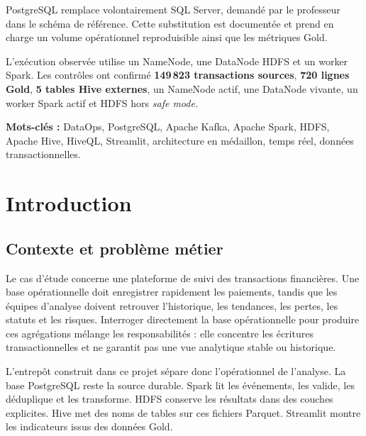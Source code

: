 \documentclass[11pt,a4paper]{report}
\begin{document}
PostgreSQL remplace volontairement SQL Server, demandé par le professeur dans
le schéma de référence. Cette substitution est documentée et prend en charge
un volume opérationnel reproduisible ainsi que les métriques Gold.

L'exécution observée utilise un NameNode, une DataNode HDFS et un worker Spark.
Les contrôles ont confirmé
\textbf{149\,823 transactions sources}, \textbf{720 lignes Gold},
\textbf{5 tables Hive externes}, un NameNode actif, une DataNode vivante,
un worker Spark actif et HDFS hors \em{safe mode}.

\textbf{Mots-clés :} DataOps, PostgreSQL, Apache Kafka, Apache Spark,
HDFS, Apache Hive, HiveQL, Streamlit, architecture en médaillon, temps réel,
données transactionnelles.

\tableofcontents
\listoffigures
\listoftables
\clearpage
\hypersetup{pageanchor=true}

\chapter{Introduction}

\section{Contexte et problème métier}
Le cas d'étude concerne une plateforme de suivi des transactions financières.
Une base opérationnelle doit enregistrer rapidement les paiements, tandis que
les équipes d'analyse doivent retrouver l'historique, les tendances,
les pertes, les statuts et les risques. Interroger directement la base
opérationnelle pour produire ces agrégations mélange les responsabilités :
elle concentre les écritures transactionnelles et ne garantit pas une vue
analytique stable ou historique.

L'entrepôt construit dans ce projet sépare donc l'opérationnel de l'analyse.
La base PostgreSQL reste la source durable. Spark lit les événements,
les valide, les déduplique et les transforme. HDFS conserve les résultats
dans des couches explicites. Hive met des noms de tables sur ces fichiers
Parquet. Streamlit montre les indicateurs issus des données Gold.
\end{document}
